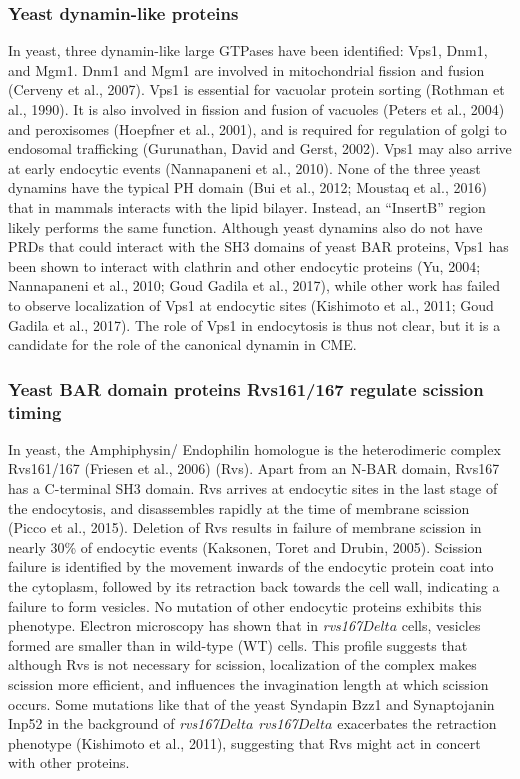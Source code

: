 		\subsubsection{Yeast dynamin-like proteins}
In yeast, three dynamin-like large GTPases have been identified: Vps1, Dnm1, and Mgm1. Dnm1 and Mgm1 are involved in mitochondrial fission and fusion (Cerveny et al., 2007). Vps1 is essential for vacuolar protein sorting (Rothman et al., 1990). It is also involved in fission and fusion of vacuoles (Peters et al., 2004) and peroxisomes (Hoepfner et al., 2001), and is required for regulation of golgi to endosomal trafficking (Gurunathan, David and Gerst, 2002). Vps1 may also arrive at early endocytic events (Nannapaneni et al., 2010). None of the three yeast dynamins have the typical PH domain (Bui et al., 2012; Moustaq et al., 2016) that in mammals interacts with the lipid bilayer. Instead, an “InsertB” region likely performs the same function. Although yeast dynamins also do not have PRDs that could interact with the SH3 domains of yeast BAR proteins, Vps1 has been shown to interact with clathrin and other endocytic proteins (Yu, 2004; Nannapaneni et al., 2010; Goud Gadila et al., 2017), while other work has failed to observe localization of Vps1 at endocytic sites (Kishimoto et al., 2011; Goud Gadila et al., 2017). The role of Vps1 in endocytosis is thus not clear, but it is a candidate for the role of the canonical dynamin in CME.



		\subsubsection{Yeast BAR domain proteins Rvs161/167 regulate scission timing}
In yeast, the Amphiphysin/ Endophilin homologue is the heterodimeric complex Rvs161/167 (Friesen et al., 2006) (Rvs). Apart from an N-BAR domain, Rvs167 has a C-terminal SH3 domain. Rvs arrives at endocytic sites in the last stage of the endocytosis, and disassembles rapidly at the time of membrane scission (Picco et al., 2015). Deletion of Rvs results in failure of membrane scission in nearly 30\% of endocytic events (Kaksonen, Toret and Drubin, 2005). Scission failure is identified by the movement inwards of the endocytic protein coat into the cytoplasm, followed by its retraction back towards the cell wall, indicating a failure to form vesicles. No mutation of other endocytic proteins exhibits this phenotype. Electron microscopy has shown that in \textit{rvs167$Delta$} cells, vesicles formed are smaller than in wild-type (WT) cells. This profile suggests that although Rvs is not necessary for scission, localization of the complex makes scission more efficient, and influences the invagination length at which scission occurs. Some mutations like that of the yeast Syndapin Bzz1 and Synaptojanin Inp52 in the background of \textit{rvs167$Delta$} \textit{rvs167$Delta$} exacerbates the retraction phenotype (Kishimoto et al., 2011), suggesting that Rvs might act in concert with other proteins. 

